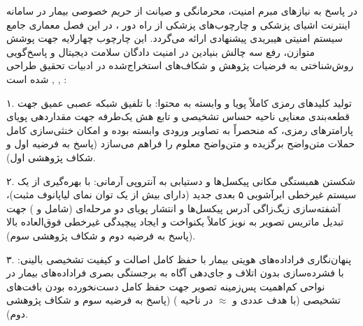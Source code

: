 




در پاسخ به نیازهای مبرم امنیت، محرمانگی و صیانت از حریم خصوصی بیمار در سامانه اینترنت اشیای پزشکی  و چارچوب‌های پزشکی از راه دور ، در این فصل معماری جامع سیستم امنیتی هیبریدی پیشنهادی ارائه می‌گردد. این چارچوب چهارلایه جهت پوشش متوازن، رفع سه چالش بنیادین در امنیت دادگان سلامت دیجیتال و پاسخ‌گویی روش‌شناختی به فرضیات پژوهش و شکاف‌های استخراج‌شده در ادبیات تحقیق طراحى شده است , , :\par



۱. تولید کلیدهای رمزی کاملاً پویا و وابسته به محتوا: با تلفیق شبکه عصبی عمیق  جهت قطعه‌بندی معنایی ناحیه حساس تشخیصی  و تابع هش یک‌طرفه  جهت مقداردهی پویای پارامترهای رمزی، که منحصراً به تصاویر ورودی وابسته بوده و امکان خنثی‌سازی کامل حملات متن‌واضح برگزیده  و متن‌واضح معلوم  را فراهم می‌سازد (پاسخ به فرضیه اول و شکاف پژوهشی اول).\par



۲. شکستن همبستگی مکانی پیکسل‌ها و دستیابی به آنتروپی آرمانی: با بهره‌گیری از یک سیستم غیرخطی ابرآشوبی ۵ بعدی جدید (دارای بیش از یک توان نمای لیاپانوف مثبت)، آشفته‌سازی زیگ‌زاگی آدرس پیکسل‌ها و انتشار پویای دو مرحله‌ای  (شامل  و ) جهت تبدیل ماتریس تصویر به نویز کاملاً یکنواخت و ایجاد پیچیدگی غیرخطی فوق‌العاده بالا (پاسخ به فرضیه دوم و شکاف پژوهشی سوم).\par



۳. پنهان‌نگاری فراداده‌های هویتی بیمار با حفظ کامل اصالت و کیفیت تشخیصی بالینی: با فشرده‌سازی بدون اتلاف  و جای‌دهی آگاه به برجستگی بصری  فراداده‌های بیمار در نواحی کم‌اهمیت پس‌زمینه تصویر جهت حفظ کامل دست‌نخورده بودن بافت‌های تشخیصی (با هدف عددی  و  \ensuremath{\approx}  در ناحیه ) (پاسخ به فرضیه سوم و شکاف پژوهشی دوم).\par

